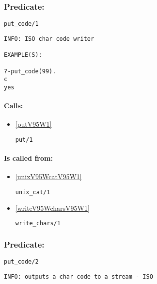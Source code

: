 \subsubsection{Predicate:} \label{putV95WcodeV95W1}

\begin{verbatim}
put_code/1
\end{verbatim}

{\small \begin{verbatim}
INFO: ISO char code writer

EXAMPLE(S):

?-put_code(99).
c
yes

\end{verbatim}}
\paragraph{Calls:} 
\begin{itemize}
\item \ref{putV95W1} 
\begin{verbatim}
put/1
\end{verbatim}

\end{itemize}
\paragraph{Is called from:} 
\begin{itemize}
\item \ref{unixV95WcatV95W1} 
\begin{verbatim}
unix_cat/1
\end{verbatim}

\item \ref{writeV95WcharsV95W1} 
\begin{verbatim}
write_chars/1
\end{verbatim}

\end{itemize}

\subsubsection{Predicate:} \label{putV95WcodeV95W2}

\begin{verbatim}
put_code/2
\end{verbatim}

{\small \begin{verbatim}
INFO: outputs a char code to a stream - ISO

\end{verbatim}}
